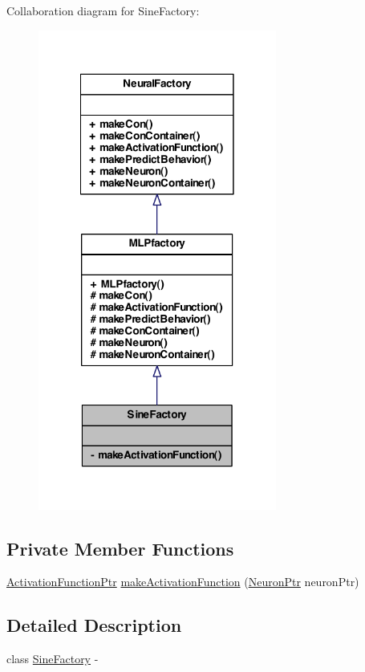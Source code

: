 Collaboration diagram for SineFactory:
\nopagebreak
\begin{figure}[H]
\begin{center}
\leavevmode
\includegraphics[width=222pt]{class_sine_factory__coll__graph}
\end{center}
\end{figure}
\subsection*{Private Member Functions}
\begin{DoxyCompactItemize}
\item 
\hyperlink{_a_m_o_r_e_8h_a77602a0277a02e5769c3df0adc669b17}{ActivationFunctionPtr} \hyperlink{class_sine_factory_aca81bca10dbcac538f58209270ebd26d}{makeActivationFunction} (\hyperlink{_a_m_o_r_e_8h_ac1ea936c2c7728eb382278131652fef4}{NeuronPtr} neuronPtr)
\end{DoxyCompactItemize}


\subsection{Detailed Description}
class \hyperlink{class_sine_factory}{SineFactory} -\/ 

